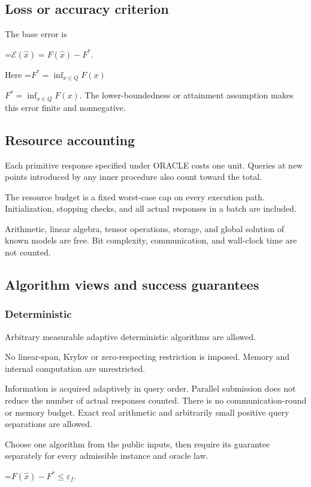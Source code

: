 \documentclass[10pt,a4paper]{article}
\newcommand{\AtlasMath}[1]{\par\begingroup\centering\setbox0=\hbox{$\displaystyle #1$}\ifdim\wd0>1.4\linewidth\typeout{ATLAS WIDE FORMULA: \the\wd0}\fi\ifdim\wd0>\linewidth\resizebox{\linewidth}{!}{\box0}\else\box0\fi\par\endgroup}
\newcommand{\AtlasInlineMath}[1]{\begingroup\setbox0=\hbox{$#1$}\ifdim\wd0>.4\linewidth\endgroup\AtlasMath{#1}\else\endgroup$#1$\fi}
\begin{document}
\subsection{Loss or accuracy criterion}
The base error is


\AtlasMath{\mathcal{E}(\widehat{x})=F(\widehat{x})-F^*.}


Here \AtlasInlineMath{F^*=\inf_{x\in Q}F(x)}. The lower-boundedness or attainment assumption makes this error finite and nonnegative.

\subsection{Resource accounting}
Each primitive response specified under ORACLE costs one unit. Queries at new points introduced by any inner procedure also count toward the total.

The resource budget is a fixed worst-case cap on every execution path. Initialization, stopping checks, and all actual responses in a batch are included.

Arithmetic, linear algebra, tensor operations, storage, and global solution of known models are free. Bit complexity, communication, and wall-clock time are not counted.

\subsection{Algorithm views and success guarantees}
\subsubsection{Deterministic}
Arbitrary measurable adaptive deterministic algorithms are allowed.

No linear-span, Krylov or zero-respecting restriction is imposed. Memory and internal computation are unrestricted.

Information is acquired adaptively in query order. Parallel submission does not reduce the number of actual responses counted. There is no communication-round or memory budget. Exact real arithmetic and arbitrarily small positive query separations are allowed.

Choose one algorithm from the public inputs, then require its guarantee separately for every admissible instance and oracle law.


\AtlasMath{F(\widehat{x})-F^*\le \varepsilon_f.}
\end{document}
